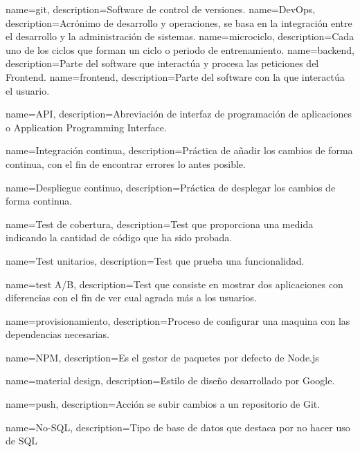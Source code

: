 {
name={git},
description={Software de control de versiones.}
}
{
name={DevOps},
description={Acrónimo de desarrollo y operaciones, se basa en la integración entre el desarrollo y la administración de sistemas.}
}
{
name={microciclo},
description={Cada uno de los ciclos que forman un ciclo o periodo de entrenamiento.}
}
{
name={backend},
description={Parte del software que interactúa y procesa las peticiones del Frontend.}
}
{
name={frontend},
description={Parte del software con la que interactúa el usuario.}
}

{
name={API},
description={Abreviación de interfaz de programación de aplicaciones o Application Programming Interface. }
}

{
name={Integración continua},
description={Práctica de añadir los cambios de forma continua, con el fin de encontrar errores lo antes posible.}
}

{
name={Despliegue continuo},
description={Práctica de desplegar los cambios de forma continua.}
}

{
name={Test de cobertura},
description={Test que proporciona una medida indicando la cantidad de código que ha sido probada.}
}

{
name={Test unitarios},
description={Test que prueba una funcionalidad.}
}

{
name={test A/B},
description={Test que consiste en mostrar dos aplicaciones con diferencias con el fin de ver cual agrada más a los usuarios.}
}

{
name={provisionamiento},
description={Proceso de configurar una maquina con las dependencias necesarias.}
}

{
name={NPM},
description={Es el gestor de paquetes por defecto de Node.js}
}

{
name={material design},
description={Estilo de diseño desarrollado por Google.}
}

{
name={push},
description={Acción se subir cambios a un repositorio de Git.}
}

{
name={No-SQL},
description={Tipo de base de datos que destaca por no hacer uso de SQL}
}

